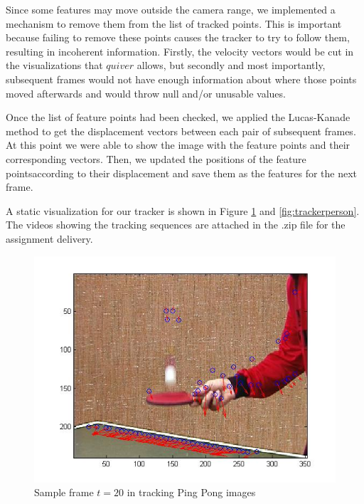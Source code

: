\documentclass[11pt]{article}
\begin{document}
Since some features may move outside the camera range, we implemented a
mechanism to remove them from the list of tracked points. This is important
because failing to remove these points causes the tracker to try to follow them,
resulting in incoherent information. Firstly, the velocity vectors would be cut
in the visualizations that $quiver$ allows, but secondly and most importantly,
subsequent frames would not have enough information about where those points
moved afterwards and would throw null and/or unusable values.  

Once the list of feature points had been checked, we applied the Lucas-Kanade
method to get the displacement vectors between each pair of subsequent frames.
At this point we were able to show the image with the feature points and their
corresponding vectors. Then, we updated the positions of the feature
pointsaccording to their displacement and save them as the features for the next
frame. 

A static visualization for our tracker is shown in Figure
\ref{fig:tracker_pingpong} and \ref{fig:trackerperson}. The videos showing the
tracking sequences are attached in the .zip file for the assignment delivery.

\begin{figure}[H] \centering
	\includegraphics[width=.8\textwidth]{imgs/tracker_pingpong.jpg}
	\caption{Sample frame $t = 20$ in tracking Ping Pong images}
	\label{fig:tracker_pingpong}
\end{figure}
\end{document}
